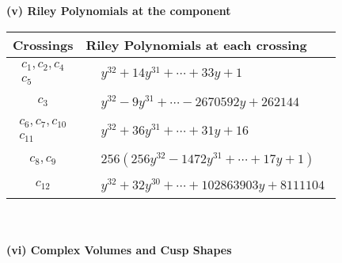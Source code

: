 \documentclass[1p]{elsarticle_modified}
\theoremstyle{definition}
\begin{document}
\newpage\renewcommand{\arraystretch}{1}
\flushleft \textbf{(v) Riley Polynomials at the component}\newline \\
\begin{tabular}{m{50pt}|m{274pt}}
Crossings & \hspace{64pt}Riley Polynomials at each crossing \\
\hline $$\begin{aligned}c_{1},c_{2},c_{4}\\c_{5}\end{aligned}$$&$\begin{aligned}
&y^{32}+14 y^{31}+\cdots+33 y+1
\end{aligned}$\\
\hline $$\begin{aligned}c_{3}\end{aligned}$$&$\begin{aligned}
&y^{32}-9 y^{31}+\cdots-2670592 y+262144
\end{aligned}$\\
\hline $$\begin{aligned}c_{6},c_{7},c_{10}\\c_{11}\end{aligned}$$&$\begin{aligned}
&y^{32}+36 y^{31}+\cdots+31 y+16
\end{aligned}$\\
\hline $$\begin{aligned}c_{8},c_{9}\end{aligned}$$&$\begin{aligned}
&256(256 y^{32}-1472 y^{31}+\cdots+17 y+1)
\end{aligned}$\\
\hline $$\begin{aligned}c_{12}\end{aligned}$$&$\begin{aligned}
&y^{32}+32 y^{30}+\cdots+102863903 y+8111104
\end{aligned}$\\
\hline
\end{tabular}\\~\\
\newpage\flushleft \textbf{(vi) Complex Volumes and Cusp Shapes}
\end{document}
